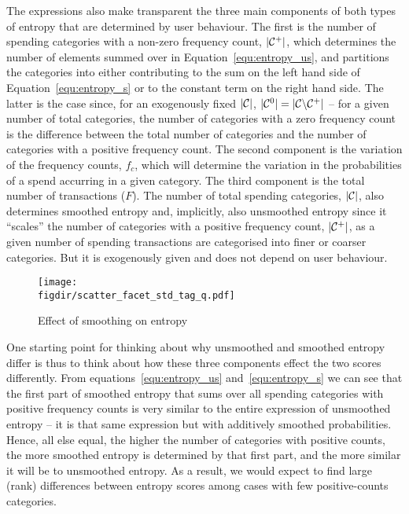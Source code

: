 The expressions also make transparent the three main components of both types
of entropy that are determined by user behaviour. The first is the number of
spending categories with a non-zero frequency count, $|\mathcal{C}^{+}|$, which
determines the number of elements summed over in Equation~\ref{equ:entropy_us},
and partitions the categories into either contributing to the sum on the left
hand side of Equation~\ref{equ:entropy_s} or to the constant term on the right
hand side. The latter is the case since, for an exogenously fixed $|\mathcal{C}|$,
$|\mathcal{C}^{0}| = |\mathcal{C} \backslash \mathcal{C}^{+}|$ -- for a given number of total
categories, the number of categories with a zero frequency count is the
difference between the total number of categories and the number of categories
with a positive frequency count. The second component is the variation of the
frequency counts, $f_c$, which will determine the variation in the
probabilities of a spend accurring in a given category. The third component is
the total number of transactions ($F$). The number of total spending
categories, $|\mathcal{C}|$, also determines smoothed entropy and, implicitly, also
unsmoothed entropy since it ``scales'' the number of categories with a positive
frequency count, $|\mathcal{C}^{+}|$, as a given number of spending transactions are
categorised into finer or coarser categories. But it is exogenously given and
does not depend on user behaviour.

\begin{figure}[ht]
    \centering 
    \caption{Effect of smoothing on entropy}
    \label{fig:scatter_facets}
    \texttt{[image: \\figdir/scatter\_facet\_std\_tag\_q.pdf]}
\end{figure}

One starting point for thinking about why unsmoothed and smoothed entropy
differ is thus to think about how these three components effect the two scores
differently. From equations~\ref{equ:entropy_us} and~\ref{equ:entropy_s} we can
see that the first part of smoothed entropy that sums over all spending
categories with positive frequency counts is very similar to the entire
expression of unsmoothed entropy -- it is that same expression but with
additively smoothed probabilities. Hence, all else equal, the higher the number
of categories with positive counts, the more smoothed entropy is determined by
that first part, and the more similar it will be to unsmoothed entropy. As a
result, we would expect to find large (rank) differences between entropy scores
among cases with few positive-counts categories.

